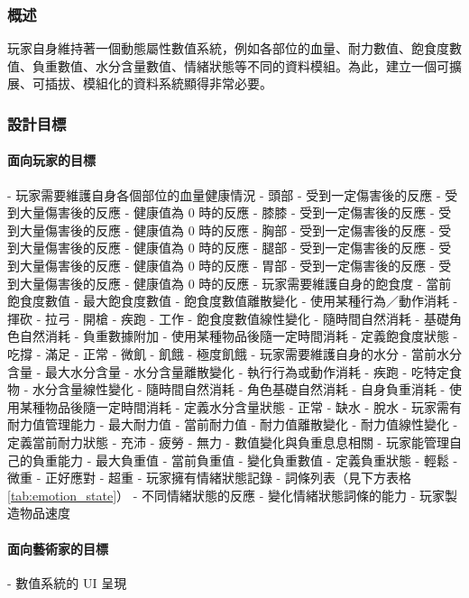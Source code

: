 \subsubsection{概述}
玩家自身維持著一個動態屬性數值系統，例如各部位的血量、耐力數值、飽食度數值、負重數值、水分含量數值、情緒狀態等不同的資料模組。為此，建立一個可擴展、可插拔、模組化的資料系統顯得非常必要。
\subsubsection{設計目標}
\paragraph{\Large\bfseries 面向玩家的目標}
\begin{markdown}
- 玩家需要維護自身各個部位的血量健康情況
  - 頭部
    - 受到一定傷害後的反應
    - 受到大量傷害後的反應
    - 健康值為 0 時的反應
  - 膝膝
    - 受到一定傷害後的反應
    - 受到大量傷害後的反應
    - 健康值為 0 時的反應
  - 胸部
    - 受到一定傷害後的反應
    - 受到大量傷害後的反應
    - 健康值為 0 時的反應
  - 腿部
    - 受到一定傷害後的反應
    - 受到大量傷害後的反應
    - 健康值為 0 時的反應
  - 胃部
    - 受到一定傷害後的反應
    - 受到大量傷害後的反應
    - 健康值為 0 時的反應
- 玩家需要維護自身的飽食度
  - 當前飽食度數值
  - 最大飽食度數值
  - 飽食度數值離散變化
    - 使用某種行為／動作消耗
      - 揮砍
      - 拉弓
      - 開槍
      - 疾跑
      - 工作
  - 飽食度數值線性變化
    - 隨時間自然消耗
      - 基礎角色自然消耗
      - 負重數據附加
    - 使用某種物品後隨一定時間消耗
  - 定義飽食度狀態
    - 吃撐
    - 滿足
    - 正常
    - 微飢
    - 飢餓
    - 極度飢餓
- 玩家需要維護自身的水分
  - 當前水分含量
  - 最大水分含量
  - 水分含量離散變化
    - 執行行為或動作消耗
      - 疾跑
      - 吃特定食物
  - 水分含量線性變化
    - 隨時間自然消耗
      - 角色基礎自然消耗
      - 自身負重消耗
    - 使用某種物品後隨一定時間消耗
  - 定義水分含量狀態
    - 正常
    - 缺水
    - 脫水
- 玩家需有耐力值管理能力
  - 最大耐力值
  - 當前耐力值
  - 耐力值離散變化
  - 耐力值線性變化
  - 定義當前耐力狀態
    - 充沛
    - 疲勞
    - 無力
  - 數值變化與負重息息相關
- 玩家能管理自己的負重能力
  - 最大負重值
  - 當前負重值
  - 變化負重數值
  - 定義負重狀態
    - 輕鬆
    - 微重
    - 正好應對
    - 超重
- 玩家擁有情緒狀態記錄 
  - 詞條列表（見下方表格\ref{tab:emotion_state}）
  - 不同情緒狀態的反應
  - 變化情緒狀態詞條的能力
- 玩家製造物品速度

\end{markdown}
\paragraph{\Large\bfseries 面向藝術家的目標}
\begin{markdown}
- 數值系統的 UI 呈現
\end{markdown}
